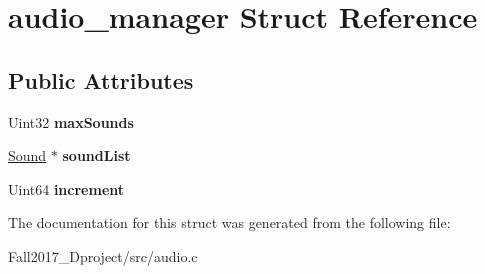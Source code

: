 \hypertarget{structaudio__manager}{}\section{audio\+\_\+manager Struct Reference}
\label{structaudio__manager}
\subsection*{Public Attributes}
\begin{DoxyCompactItemize}
\item 
\mbox{\label{structaudio__manager_a3820c21831fa17b7feae99c9e8117601}} 
Uint32 {\bfseries max\+Sounds}
\item 
\mbox{\label{structaudio__manager_a74fb5cdcf6d8bc3fbf9641d963f374e1}} 
\hyperlink{structsound__s}{Sound} $\ast$ {\bfseries sound\+List}
\item 
\mbox{\label{structaudio__manager_acfcfbf6e14aac9917e0449bf630908cd}} 
Uint64 {\bfseries increment}
\end{DoxyCompactItemize}


The documentation for this struct was generated from the following file\+:\begin{DoxyCompactItemize}
\item 
Fall2017\+\_\+Dproject/src/audio.\+c\end{DoxyCompactItemize}
